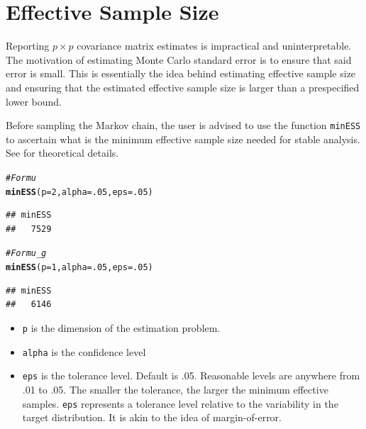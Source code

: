 \documentclass[11pt]{article}\usepackage[]{graphicx}\usepackage[]{color}
\makeatletter
\newcommand{\hlnum}[1]{\textcolor[rgb]{0.686,0.059,0.569}{#1}}%
\newcommand{\hlcom}[1]{\textcolor[rgb]{0.678,0.584,0.686}{\textit{#1}}}%
\newcommand{\hlstd}[1]{\textcolor[rgb]{0.345,0.345,0.345}{#1}}%
\newcommand{\hlkwc}[1]{\textcolor[rgb]{0.333,0.667,0.333}{#1}}%
\newcommand{\hlkwd}[1]{\textcolor[rgb]{0.737,0.353,0.396}{\textbf{#1}}}%
\newenvironment{kframe}{%
 \def\at@end@of@kframe{}%
 \ifinner\ifhmode%
  \def\at@end@of@kframe{\end{minipage}}%
  \begin{minipage}{\columnwidth}%
 \fi\fi%
 \def\FrameCommand##1{\hskip\@totalleftmargin \hskip-\fboxsep
 \colorbox{shadecolor}{##1}\hskip-\fboxsep
     \hskip-\linewidth \hskip-\@totalleftmargin \hskip\columnwidth}%
 \MakeFramed {\advance\hsize-\width
   \@totalleftmargin\z@ \linewidth\hsize
   \@setminipage}}%
 {\par\unskip\endMakeFramed%
 \at@end@of@kframe}
\newenvironment{knitrout}{}{} %
\makeatother
\begin{document}
\section{Effective Sample Size}
Reporting $p \times p$ covariance matrix estimates is impractical and uninterpretable. The motivation of estimating Monte Carlo standard error is to ensure that said error is small. This is essentially the idea behind estimating effective sample size and ensuring that the estimated effective sample size is larger than a prespecified lower bound.

Before sampling the Markov chain, the user is advised to use the function \texttt{minESS} to ascertain what is the minimum effective sample size needed for stable analysis. See \cite{vats:fleg:jones:2017b} for theoretical details.

\begin{knitrout}
\color{fgcolor}\begin{kframe}
\begin{alltt}
\hlcom{# For mu}
\hlkwd{minESS}\hlstd{(}\hlkwc{p} \hlstd{=} \hlnum{2}\hlstd{,} \hlkwc{alpha} \hlstd{=} \hlnum{.05}\hlstd{,} \hlkwc{eps} \hlstd{=} \hlnum{.05}\hlstd{)}
\end{alltt}
\begin{verbatim}
## minESS 
##   7529
\end{verbatim}
\begin{alltt}
\hlcom{#For mu_g}
\hlkwd{minESS}\hlstd{(}\hlkwc{p} \hlstd{=} \hlnum{1}\hlstd{,} \hlkwc{alpha} \hlstd{=} \hlnum{.05}\hlstd{,} \hlkwc{eps} \hlstd{=} \hlnum{.05}\hlstd{)}
\end{alltt}
\begin{verbatim}
## minESS 
##   6146
\end{verbatim}
\end{kframe}
\end{knitrout}

\begin{itemize}
\item \texttt{p} is the dimension of the estimation problem.
\item \texttt{alpha} is the confidence level
\item \texttt{eps} is the tolerance level. Default is .05. Reasonable levels are anywhere from .01 to .05. The smaller the tolerance, the larger the minimum effective samples. \texttt{eps} represents a tolerance level relative to the variability in the target distribution. It is akin to the idea of margin-of-error.
\end{itemize}
\end{document}
